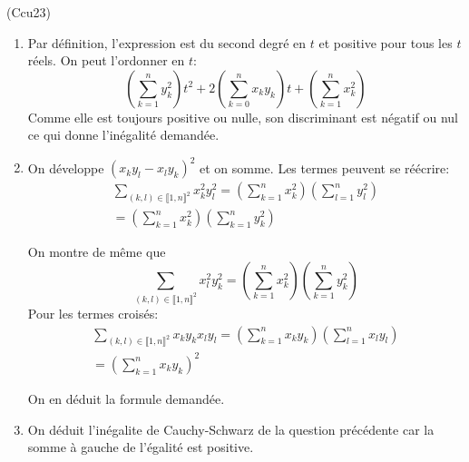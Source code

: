 \begin{tiny}(Ccu23)\end{tiny}
\begin{enumerate}
 \item Par définition, l'expression est du second degré en $t$ et positive pour tous les $t$ réels. On peut l'ordonner en $t$:
\begin{displaymath}
 \left( \sum_{k=1}^n y_k^2\right)t^2 + 2\left(\sum_{k=0}^n x_ky_k \right)t + \left( \sum_{k=1}^n x_k^2\right)
\end{displaymath}
Comme elle est toujours positive ou nulle, son discriminant est négatif ou nul ce qui donne l'inégalité demandée.

 \item On développe $(x_ky_l-x_ly_k)^2$ et on somme. Les termes peuvent se réécrire:
\begin{multline*}
 \sum_{(k,l)\in\llbracket 1,n \rrbracket^2}x_k^2y_l^2
 = \left( \sum_{k=1}^{n}x_k^2\right) \left( \sum_{l=1}^{n}y_l^2\right)\\
 = \left( \sum_{k=1}^{n}x_k^2\right) \left( \sum_{k=1}^{n}y_k^2\right)
\end{multline*}

On montre de même que
\begin{displaymath}
\sum_{(k,l)\in\llbracket 1,n \rrbracket^2}x_l^2y_k^2
= \left( \sum_{k=1}^{n}x_k^2\right) \left( \sum_{k=1}^{n}y_k^2\right)
\end{displaymath}
Pour les termes croisés:
\begin{multline*}
\sum_{(k,l)\in\llbracket 1,n \rrbracket^2}x_ky_kx_ly_l
= \left( \sum_{k=1}^{n}x_ky_k\right) \left( \sum_{l=1}^{n}x_ly_l\right)\\
= \left( \sum_{k=1}^{n}x_ky_k\right)^2
\end{multline*}

On en déduit la formule demandée.

 \item On déduit l'inégalite de Cauchy-Schwarz de la question précédente car la somme à gauche de l'égalité est positive.
\end{enumerate}
